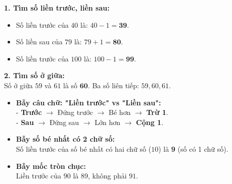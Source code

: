 \documentclass[11pt,a4paper]{article}
\begin{document}
\vspace{-1.5mm}
\noindent
\begin{minipage}[t]{0.49\textwidth}\vspace{0pt}
\begin{tcolorbox}[
  enhanced,
  colback=green!4!white,
  colframe=green!60!black,
  arc=2mm, boxrule=0.8pt,
  left=2mm, right=2mm, top=1.8mm, bottom=1.8mm,
  title={\footnotesize\bfseries\color{white}\faCheckCircle\ 4. Ví dụ thực hành chuẩn mực}
]
{\footnotesize
\textbf{1. Tìm số liền trước, liền sau:}\\
\begin{itemize}\setlength{\itemsep}{0.5pt}\setlength{\leftskip}{-2.5mm}
  \item Số liền trước của $40$ là: $40 - 1 = \mathbf{39}$.
  \item Số liền sau của $79$ là: $79 + 1 = \mathbf{80}$.
  \item Số liền trước của $100$ là: $100 - 1 = \mathbf{99}$.
\end{itemize}
\textbf{2. Tìm số ở giữa:}\\
Số ở giữa $59$ và $61$ là số $\mathbf{60}$.
Ba số liên tiếp: $59, 60, 61$.
}
\end{tcolorbox}
\end{minipage}
\hfill
\begin{minipage}[t]{0.49\textwidth}\vspace{0pt}
\begin{tcolorbox}[
  enhanced,
  colback=red!4!white,
  colframe=red!75!black,
  arc=2mm, boxrule=0.8pt,
  left=2mm, right=2mm, top=1.8mm, bottom=1.8mm,
  title={\footnotesize\bfseries\color{white}\faExclamationTriangle\ 5. Mẹo tránh bẫy trắc nghiệm}
]
{\footnotesize
\begin{itemize}\setlength{\itemsep}{1pt}\setlength{\leftskip}{-2.5mm}
  \item \textbf{Bẫy câu chữ: "Liền trước" vs "Liền sau":}\\
  - \textbf{Trước} $\to$ Đứng trước $\to$ Bé hơn $\to$ \textbf{Trừ 1}.\\
  - \textbf{Sau} $\to$ Đứng sau $\to$ Lớn hơn $\to$ \textbf{Cộng 1}.
  \item \textbf{Bẫy số bé nhất có 2 chữ số:}\\
  Số liền trước của số bé nhất có hai chữ số ($10$) là \textbf{9} (số có 1 chữ số).
  \item \textbf{Bẫy mốc tròn chục:}\\
  Liền trước của $90$ là $89$, không phải $91$.
\end{itemize}
}
\end{tcolorbox}
\end{minipage}
\end{document}
